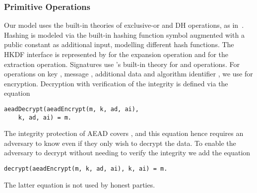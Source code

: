 \subsubsection{Primitive Operations}
Our model uses the built-in theories of exclusive-or and DH operations, as
in~\cite{DBLP:conf/csfw/DreierHRS18,DBLP:conf/csfw/SchmidtMCB12}.
%
Hashing is modeled via the built-in hashing function symbol augmented
with a public constant as additional input, modelling different
hash functions.
%
%
The HKDF interface is represented by  for the
expansion operation and  for the extraction operation.
%
Signatures use \mTamarin's built-in theory for  and 
operations.
%
%
%
For \mAead{} operations on key , message \mbox{}, additional data 
and algorithm identifier , we use 
for encryption.
%
Decryption with verification of the integrity is defined via the equation
\begin{small}\begin{verbatim}
aeadDecrypt(aeadEncrypt(m, k, ad, ai),
    k, ad, ai) = m.
\end{verbatim}\end{small}
%
The integrity protection of AEAD covers , and this equation hence requires
an adversary to know  even if they only wish to decrypt the data.
%
To enable the adversary to decrypt without needing to verify the integrity
we add the equation
\begin{small}\begin{verbatim}
decrypt(aeadEncrypt(m, k, ad, ai), k, ai) = m.
\end{verbatim}\end{small}
%
The latter equation is not used by honest parties.
%

